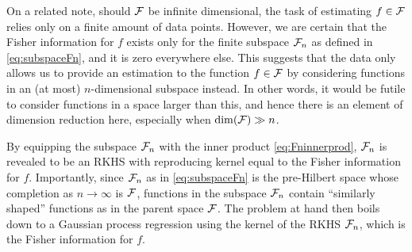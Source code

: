 \documentclass[11pt,twoside,openright]{report}
\begin{document}
On a related note, should ${\mathcal F}$ be infinite dimensional, the task of estimating $f\in{\mathcal F}$ relies only on a finite amount of data points.
However, we are certain that the Fisher information for $f$ exists only for the finite subspace ${\mathcal F}_n$ as defined in \cref{eq:subspaceFn}, and it is zero everywhere else.
This suggests that the data only allows us to provide an estimation to the function $f\in{\mathcal F}$ by considering functions in an (at most) $n$-dimensional subspace instead.
In other words, it would be futile to consider functions in a space larger than this, and hence there is an element of dimension reduction here, especially when $\dim({\mathcal F}) \gg n$.

By equipping the subspace ${\mathcal F}_n$ with the inner product \cref{eq:Fninnerprod}, ${\mathcal F}_n$ is revealed to be an RKHS with reproducing kernel equal to the Fisher information for $f$.
Importantly, since ${\mathcal F}_n$ as in \cref{eq:subspaceFn} is the pre-Hilbert space whose completion as $n\to\infty$ is ${\mathcal F}$, functions in the subspace ${\mathcal F}_n$ contain ``similarly shaped'' functions as in the parent space ${\mathcal F}$.
The problem at hand then boils down to a Gaussian process regression using the kernel of the RKHS ${\mathcal F}_n$, which is the Fisher information for $f$.

\hClosingStuffStandalone
\end{document}
